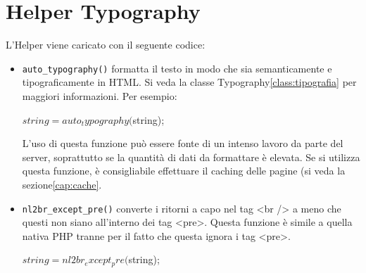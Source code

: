 \section{Helper Typography}
\label{helper:typography}

L'Helper viene caricato con il seguente codice:


\begin{itemize}
\item \verb|auto_typography()| formatta il testo in modo che sia semanticamente e tipograficamente in \ac{HTML}. Si veda la classe Typography\vref{class:tipografia} per maggiori informazioni. Per esempio:

 \begin{code}
$string = auto_typography($string);
\end{code}

L'uso di questa funzione può essere fonte di un intenso lavoro da parte del server, soprattutto se la quantità di dati da formattare è elevata. Se si utilizza questa funzione, è consigliabile effettuare il caching delle pagine (si veda la sezione\vref{cap:cache}.

\item \verb|nl2br_except_pre()| converte i ritorni a capo nel tag <br /> a meno che questi non siano all'interno dei tag <pre>. Questa funzione è simile a quella nativa PHP  tranne per il fatto che questa ignora i tag <pre>.

 \begin{code}
$string = nl2br_except_pre($string);
\end{code}
\end{itemize}